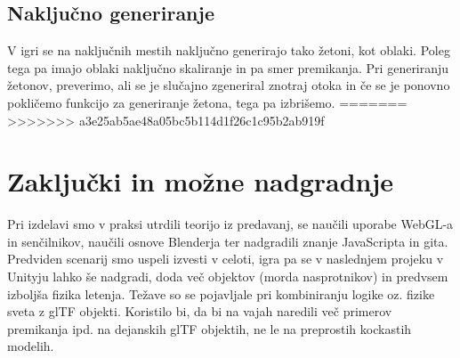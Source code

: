 \documentclass[a4paper]{article}
\begin{document}
\subsection{Naključno generiranje}%
V igri se na naključnih mestih naključno generirajo tako žetoni, kot oblaki. Poleg tega pa imajo oblaki naključno skaliranje in pa smer premikanja. Pri generiranju žetonov, preverimo, ali se je slučajno zgeneriral znotraj otoka in če se je ponovno pokličemo funkcijo za generiranje žetona, tega pa izbrišemo.
=======
>>>>>>> a3e25ab5ae48a05bc5b114d1f26c1c95b2ab919f

\section{Zaključki in možne nadgradnje} %
Pri izdelavi smo v praksi utrdili teorijo iz predavanj, se naučili uporabe WebGL-a in senčilnikov, naučili osnove Blenderja ter nadgradili znanje JavaScripta in gita. Predviden scenarij smo uspeli izvesti v celoti, igra pa se v naslednjem projeku v Unityju lahko še nadgradi, doda več objektov (morda nasprotnikov) in predvsem izboljša fizika letenja. Težave so se pojavljale pri kombiniranju logike oz. fizike sveta z glTF objekti. Koristilo bi, da bi na vajah naredili več primerov premikanja ipd. na dejanskih glTF objektih, ne le na preprostih kockastih modelih. 

\small

%
\end{document}
